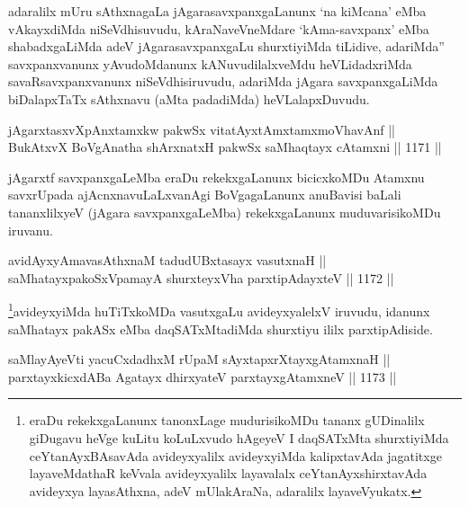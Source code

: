 \begin{artha}
adaralilx mUru sAthxnagaLa jAgarasavxpanxgaLanunx `na kiMcana' eMba vAkayxdiMda niSeVdhisuvudu, kAraNaveVneMdare `kAma-savxpanx' eMba shabadxgaLiMda adeV jAgarasavxpanxgaLu shurxtiyiMda tiLidive, adariMda'' savxpanxvanunx yAvudoMdanunx kANuvudilalxveMdu heVLidadxriMda savaRsavxpanxvanunx niSeVdhisiruvudu, adariMda jAgara savxpanxgaLiMda biDalapxTaTx sAthxnavu (aMta padadiMda) heVLalapxDuvudu.
\end{artha}


\begin{shl}
jAgarxtasxvXpAnxtamxkw pakwSx vitatAyx\s \s tAmx\s \s tamxmoVhavAnf || \\
BukAtxvX BoVgAnatha shArxnatxH pakwSx saMhaqtayx cA\s \s tamxni \hfill || 1171 ||  
\end{shl}

\begin{artha}
jAgarxtf savxpanxgaLeMba eraDu rekekxgaLanunx bicicxkoMDu Atamxnu savxrUpada ajAcnxnavuLaLxvanAgi BoVgagaLanunx anuBavisi baLali tananxlilxyeV (jAgara savxpanxgaLeMba) rekekxgaLanunx muduvarisikoMDu iruvanu.
\end{artha}


\begin{shl}
avidAyxyAmavasAthxnaM tadudUBxtasayx vasutxnaH || \\
saMhatayxpakoSxVpamayA shurxteyxVha parxtipAdayxteV \hfill || 1172 ||  
\end{shl}

\begin{artha}
\footnote{eraDu rekekxgaLanunx tanonxLage mudurisikoMDu tananx gUDinalilx giDugavu heVge kuLitu koLuLxvudo hAgeyeV I daqSATxMta shurxtiyiMda ceYtanAyxBAsavAda avideyxyalilx avideyxyiMda kalipxtavAda jagatitxge layaveMdathaR keVvala avideyxyalilx layavalalx ceYtanAyxshirxtavAda avideyxya layasAthxna, adeV mUlakAraNa, adaralilx layaveVyukatx.}avideyxyiMda huTiTxkoMDa vasutxgaLu avideyxyalelxV iruvudu, idanunx saMhatayx pakASx eMba daqSATxMtadiMda shurxtiyu ililx parxtipAdiside.
\end{artha}


\begin{shl}
saMlayAyeVti yacuCxdadhxM rUpaM sAyxtapxrXtayxgAtamxnaH || \\
parxtayxkicxdABa Agatayx dhirxyateV parxtayxgAtamxneV \hfill || 1173 ||  
\end{shl}

